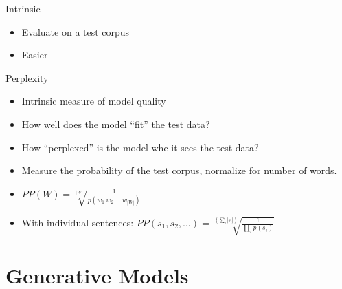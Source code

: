 \documentclass[11pt,letterpaper]{article}
\begin{document}
Intrinsic

\begin{itemize}
  \item Evaluate on a test corpus
  \item Easier
\end{itemize}

Perplexity

\begin{itemize}
  \item Intrinsic measure of model quality
  \item How well does the model ``fit'' the test data?
  \item How ``perplexed'' is the model whe it sees the test data?
  \item Measure the probability of the test corpus, normalize for number of words.
  \item $PP(W) = \sqrt[|W|]{\frac{1}{p(w_1~w_2~...~w_{|W|})}}$
  \item With individual sentences: $PP(s_1, s_2, ...) = \sqrt[(\sum_i |s_i|)]{\frac{1}{\prod_i p(s_i)}}$
\end{itemize}






\section{Generative Models}
\end{document}
